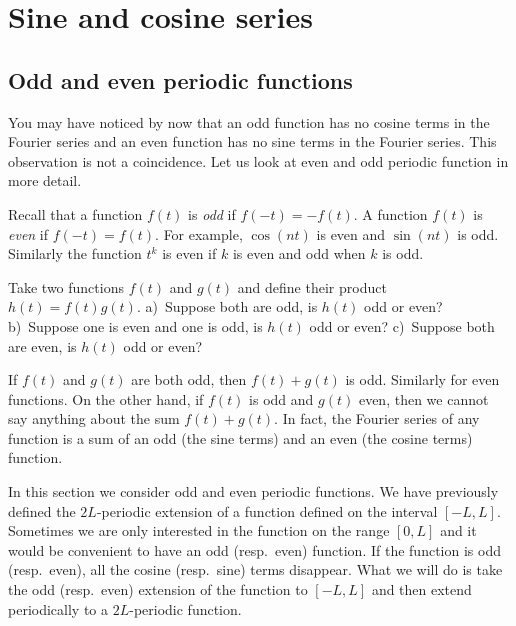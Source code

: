 \documentclass[12pt]{book}
\begin{document}

\sectionnewpage
\section{Sine and cosine series}
\label{sec:scs}


\subsection{Odd and even periodic functions}

You may have noticed by now that an odd function has no cosine terms in the 
Fourier series and an even function has no sine terms in the Fourier series.
This observation is not a coincidence.  Let us look at even and odd periodic
function in more detail.

Recall that a function $f(t)$ is \emph{odd} if $f(-t) =
-f(t)$.  A function $f(t)$ is \emph{even} if
$f(-t) = f(t)$.  For example, $\cos (n t)$ is even and $\sin (n t)$ is odd.
Similarly the function $t^k$ is even if $k$ is even and odd when $k$ is odd.

\begin{exercise}
Take two functions $f(t)$ and $g(t)$ and define their product $h(t) =
f(t)g(t)$.  a)~Suppose both are odd, is
$h(t)$ odd or even?  b)~Suppose one is even and one is odd,
is $h(t)$ odd or even?  c)~Suppose both are even, is $h(t)$
odd or even?
\end{exercise}

If $f(t)$ and $g(t)$ are both odd, then $f(t)+g(t)$ is odd.  Similarly for
even functions.  On the other hand,
if $f(t)$ is odd and $g(t)$ even, then we cannot say anything about
the sum
$f(t) + g(t)$.  In fact, the Fourier series of any function is a sum of
an odd (the sine terms) and an even (the cosine terms) function.

In this section we consider odd and even periodic
functions.  We have previously defined the $2L$-periodic extension
of a function defined on the interval $[-L,L]$.  Sometimes we are only
interested in the function on the range $[0,L]$ and it would be convenient
to have an odd (resp.\ even) function.  If the function is odd (resp.\ even),
all the cosine (resp.\ sine) terms disappear.
What we will do is
take the
odd (resp.\ even) extension of the function to $[-L,L]$ and then 
extend periodically to a $2L$-periodic function.
\end{document}
